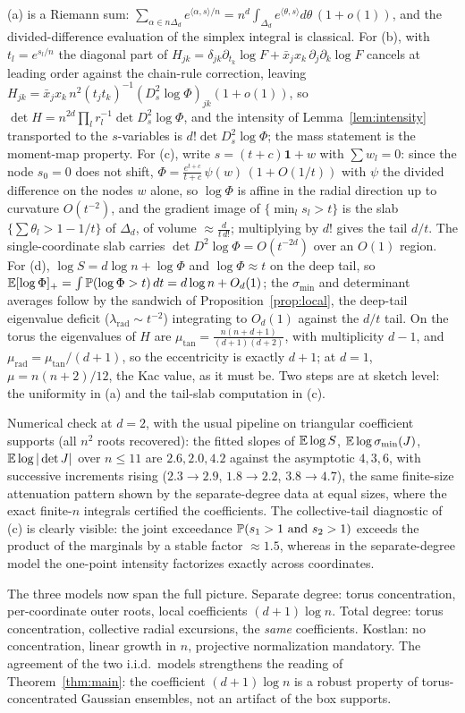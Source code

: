 \proofsketch
(a) is a Riemann sum:
$\sum_{\alpha\in n\Delta_d}e^{\langle\alpha,s\rangle/n}
= n^d\int_{\Delta_d}e^{\langle\theta,s\rangle}d\theta\,(1+o(1))$, and the
divided-difference evaluation of the simplex integral is classical. For (b), with
$t_l = e^{s_l/n}$ the diagonal part of
$H_{jk} = \delta_{jk}\partial_{t_k}\log F + \bar x_jx_k\,\partial_j\partial_k\log F$
cancels at leading order against the chain-rule correction, leaving
$H_{jk} = \bar x_jx_k\,n^2(t_jt_k)^{-1}(D_s^2\log\Phi)_{jk}(1+o(1))$, so
$\det H = n^{2d}\prod_lr_l^{-1}\det D_s^2\log\Phi$, and the intensity of
Lemma~\ref{lem:intensity} transported to the $s$-variables is
$d!\det D_s^2\log\Phi$; the mass statement is the moment-map property. For (c), write
$s = (t+c)\mathbf1 + w$ with $\sum w_l = 0$: since the node $s_0=0$ does not shift,
$\Phi = \frac{e^{t+c}}{t+c}\,\psi(w)\,(1+O(1/t))$ with $\psi$ the divided difference on
the nodes $w$ alone, so $\log\Phi$ is affine in the radial direction up to curvature
$O(t^{-2})$, and the gradient image of $\{\min_ls_l>t\}$ is the slab
$\{\sum\theta_l>1-1/t\}$ of $\Delta_d$, of volume $\approx\frac d{t\,d!}$; multiplying by
$d!$ gives the tail $d/t$. The single-coordinate slab carries
$\det D^2\log\Phi = O(t^{-2d})$ over an $O(1)$ region. For (d),
$\log S = d\log n + \log\Phi$ and $\log\Phi\approx t$ on the deep tail, so
$\E[\log\Phi]_+ = \int\P(\log\Phi>t)\,dt = d\log n + O_d(1)$; the $\sigma_{\min}$ and
determinant averages follow by the sandwich of Proposition~\ref{prop:local}, the
deep-tail eigenvalue deficit ($\lambda_{\mathrm{rad}}\sim t^{-2}$) integrating to
$O_d(1)$ against the $d/t$ tail. On the torus the eigenvalues of $H$ are
$\mu_{\tan} = \frac{n(n+d+1)}{(d+1)(d+2)}$, with multiplicity $d-1$, and
$\mu_{\mathrm{rad}} = \mu_{\tan}/(d+1)$, so the eccentricity is exactly $d+1$; at $d=1$,
$\mu = n(n+2)/12$, the Kac value, as it must be. Two steps are at sketch level: the
uniformity in (a) and the tail-slab computation in (c).
\endproof

Numerical check at $d=2$, with the usual pipeline on triangular coefficient supports (all
$n^2$ roots recovered): the fitted slopes of $\E\log S$, $\E\log\sigma_{\min}(J)$,
$\E\log|\det J|$ over $n\le11$ are $2.6, 2.0, 4.2$ against the asymptotic $4, 3, 6$, with
successive increments rising ($2.3\to2.9$, $1.8\to2.2$, $3.8\to4.7$), the same
finite-size attenuation pattern shown by the separate-degree data at equal sizes, where
the exact finite-$n$ integrals certified the coefficients. The collective-tail diagnostic
of (c) is clearly visible: the joint exceedance $\P(s_1>1\text{ and }s_2>1)$ exceeds the
product of the marginals by a stable factor $\approx1.5$, whereas in the separate-degree
model the one-point intensity factorizes exactly across coordinates.

The three models now span the full picture. Separate degree: torus concentration,
per-coordinate outer roots, local coefficients $(d+1)\log n$. Total degree: torus
concentration, collective radial excursions, the \emph{same} coefficients. Kostlan: no
concentration, linear growth in $n$, projective normalization mandatory. The agreement of
the two i.i.d.\ models strengthens the reading of Theorem~\ref{thm:main}: the coefficient
$(d+1)\log n$ is a robust property of torus-concentrated Gaussian ensembles, not an
artifact of the box supports.

